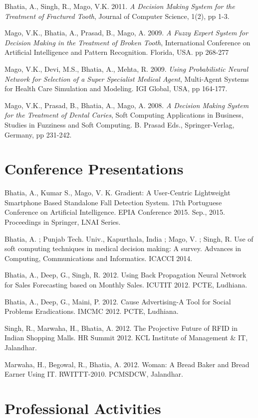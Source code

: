\documentclass[margin,line]{res}
\begin{document}
\begin{resume}
Bhatia, A., Singh, R., Mago, V.K. 2011. \emph{A Decision Making System for the Treatment of Fractured Tooth}, Journal of Computer Science, 1(2), pp 1-3.

Mago, V.K., Bhatia, A., Prasad,  B., Mago, A. 2009. \emph{A Fuzzy Expert System for Decision Making in the Treatment of Broken Tooth}, International Conference on Artificial Intelligence and Pattern Recognition. Florida, USA. pp 268-277

Mago, V.K., Devi, M.S., Bhatia, A., Mehta, R. 2009. \emph{Using Probabilistic Neural Network for Selection of a Super Specialist Medical Agent}, Multi-Agent Systems for Health Care Simulation and Modeling. IGI Global, USA, pp 164-177.

Mago, V.K., Prasad, B., Bhatia, A., Mago, A. 2008. \emph{A Decision Making System for the Treatment of Dental Caries}, Soft Computing Applications in Business, Studies in Fuzziness and Soft Computing. B. Prasad Eds., Springer-Verlag, Germany, pp 231-242.

\section{\sc Conference Presentations}
Bhatia, A., Kumar S., Mago, V. K. Gradient: A User-Centric Lightweight Smartphone Based Standalone Fall Detection System. 17th Portuguese Conference on Artificial Intelligence. EPIA Conference 2015. Sep., 2015. Proceedings in Springer, LNAI Series.

Bhatia, A. ; Punjab Tech. Univ., Kapurthala, India ; Mago, V. ; Singh, R. Use of soft computing techniques in medical decision making: A survey. Advances in Computing, Communications and Informatics. ICACCI 2014.  

Bhatia, A., Deep, G., Singh, R. 2012. Using Back Propagation Neural Network for Sales Forecasting based on Monthly Sales. ICUTIT 2012. PCTE, Ludhiana.

Bhatia, A., Deep, G., Maini, P. 2012. Cause Advertising-A Tool for Social Problems Eradications. IMCMC 2012. PCTE, Ludhiana.

Singh, R., Marwaha, H., Bhatia, A. 2012. The Projective Future of RFID in Indian Shopping Malls. HR Summit 2012. KCL Institute of Management \& IT, Jalandhar. 

Marwaha, H., Begowal, R., Bhatia, A. 2012. Woman: A Bread Baker and Bread Earner Using IT. RWITTT-2010. PCMSDCW, Jalandhar.

\section{\sc Professional Activities}


\end{resume}
\end{document}
